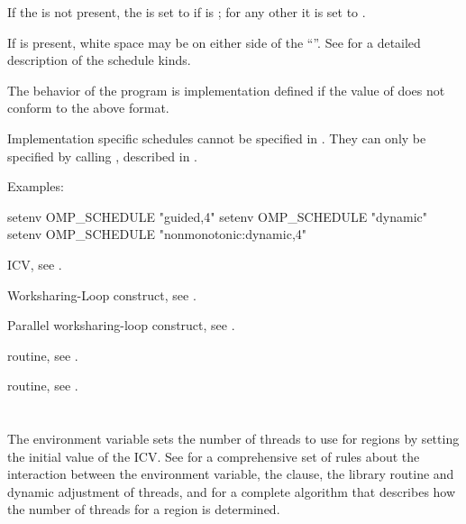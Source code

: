 If the  is not present, the  is set to
 if  is ; for any other 
it is set to .

If  is present, white space may be on either side of the
``\code{,}''. See  for a detailed
description of the schedule kinds.

The behavior of the program is implementation defined if the value of
 does not conform to the above format.

Implementation specific schedules cannot be specified in .
They can only be specified by calling , described in
.

Examples:

\begin{ompEnv}
setenv OMP_SCHEDULE "guided,4"
setenv OMP_SCHEDULE "dynamic"
setenv OMP_SCHEDULE "nonmonotonic:dynamic,4"
\end{ompEnv}

\begin{crossrefs}
\item {} ICV, see .

\item Worksharing-Loop construct, see .

\item Parallel worksharing-loop construct,
see .

\item {} routine, see .

\item {} routine, see .
\end{crossrefs}



\section{}
\label{sec:OMP_NUM_THREADS}
The  environment variable sets the number of threads
to use for  regions by setting the initial value of the
 ICV. See  for
a comprehensive set of rules about the interaction between the
 environment variable, the  clause, the
 library routine and dynamic adjustment of threads, and
for a complete algorithm that describes how the number of
threads for a  region is determined.

